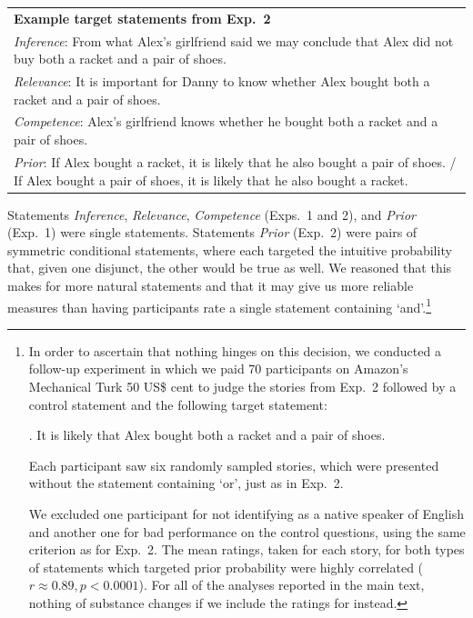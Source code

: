 \documentclass[12pt]{article}
\begin{document}
\begin{center}
\begin{tabular}{p{10cm}}
\textbf{Example target statements from Exp.\ 2}\\[0.2cm]
  \emph{Inference}: From what Alex's girlfriend said we may conclude that Alex did not buy both a racket and a
  pair of shoes.\\[.2cm]
  \emph{Relevance}: It is important for Danny to know whether Alex bought both a racket and a
  pair of shoes.\\[.2cm]
  \emph{Competence}: Alex's girlfriend knows whether he bought both a racket and a pair of shoes. \\[.2cm]
  \emph{Prior}: If Alex bought a racket, it is likely that he also bought a pair of shoes. / If Alex bought a pair of shoes, it is likely that he also bought a racket.
\end{tabular}
\end{center}

\noindent Statements \emph{Inference}, \emph{Relevance}, \emph{Competence} (Exps.\ 1 and 2), and \emph{Prior}  (Exp.\ 1) were single statements. Statements \emph{Prior} (Exp.\ 2) were pairs of symmetric conditional statements, where each targeted the intuitive probability that, given one disjunct, the other would be true as well. We reasoned that this makes for more natural statements and that it may give us more reliable measures than having participants rate a single statement containing `and'.\footnote{In order to ascertain that nothing hinges on this decision, we conducted a follow-up experiment in which we paid 70 participants on Amazon's Mechanical Turk 50 US\$ cent to judge the stories from Exp.\ 2 followed by a control statement and the following target statement:

\ex.	It is likely that Alex bought both a racket and a pair of shoes.

Each participant saw six randomly sampled stories, which were presented without the statement containing `or', just as in Exp.\ 2.

We excluded one participant for not identifying as a native speaker of English and another one
for bad performance on the control questions, using the same criterion as for Exp.\ 2. The mean
ratings, taken for each story, for both types of statements which targeted prior probability
were highly correlated ($r \approx 0.89, p < 0.0001$). For all of the analyses reported in the
main text, nothing of substance changes if we include the ratings for \Last instead.}
\end{document}
